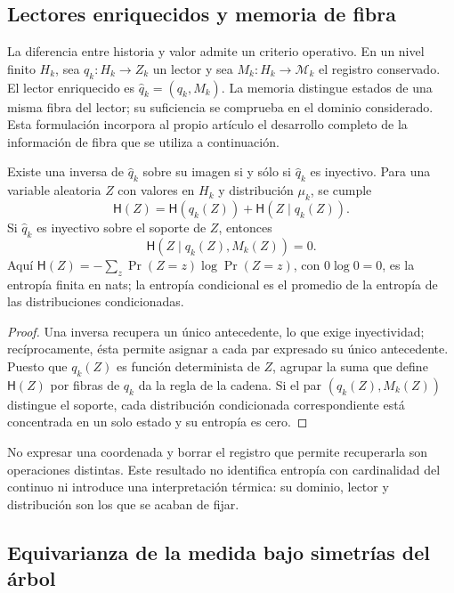 \subsection{Lectores enriquecidos y memoria de fibra}
\label{sec:ch-memoria-fibra}

La diferencia entre historia y valor admite un criterio operativo. En un
nivel finito \(H_k\), sea \(q_k:H_k\to Z_k\) un lector y sea
\(M_k:H_k\to\mathcal M_k\) el registro conservado. El lector enriquecido
es \(\widehat q_k=(q_k,M_k)\). La memoria distingue estados de una misma
fibra del lector; su suficiencia se comprueba en el dominio considerado.
Esta formulación incorpora al propio artículo el desarrollo completo de la
información de fibra que se utiliza a continuación.

\begin{proposition}
\label{prop:ch-recuperabilidad-fibra}
Existe una inversa de \(\widehat q_k\) sobre su imagen si y sólo si
\(\widehat q_k\) es inyectivo. Para una variable aleatoria \(Z\) con
valores en \(H_k\) y distribución \(\mu_k\), se cumple
\[
 \mathsf H(Z)=\mathsf H(q_k(Z))+\mathsf H(Z\mid q_k(Z)).
\]
Si \(\widehat q_k\) es inyectivo sobre el soporte de \(Z\), entonces
\[
 \mathsf H(Z\mid q_k(Z),M_k(Z))=0.
\]
Aquí \(\mathsf H(Z)=-\sum_z\Pr(Z=z)\log\Pr(Z=z)\), con
\(0\log0=0\), es la entropía finita en nats; la entropía condicional es
el promedio de la entropía de las distribuciones condicionadas.
\end{proposition}

\begin{proof}
Una inversa recupera un único antecedente, lo que exige inyectividad;
recíprocamente, ésta permite asignar a cada par expresado su único
antecedente. Puesto que \(q_k(Z)\) es función determinista de \(Z\),
agrupar la suma que define \(\mathsf H(Z)\) por fibras de \(q_k\) da la
regla de la cadena. Si el par \((q_k(Z),M_k(Z))\) distingue el soporte,
cada distribución condicionada correspondiente está concentrada en un solo
estado y su entropía es cero.
\end{proof}

No expresar una coordenada y borrar el registro que permite recuperarla son
operaciones distintas. Este resultado no identifica entropía con cardinalidad
del continuo ni introduce una interpretación térmica: su dominio, lector y
distribución son los que se acaban de fijar.

\subsection{Equivarianza de la medida bajo simetrías del árbol}
\label{sec:ch-naturalidad-medida}

